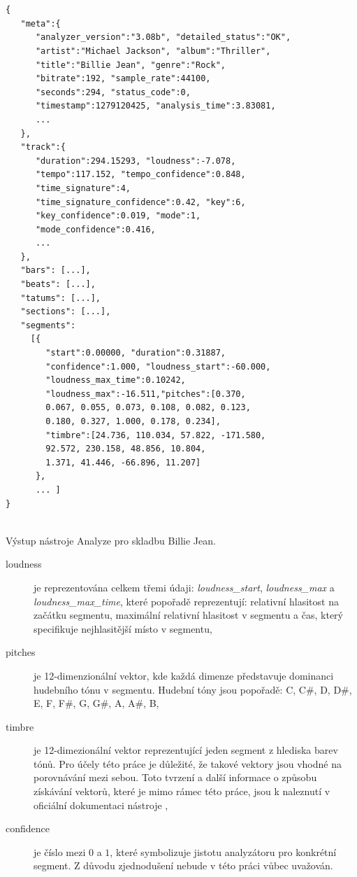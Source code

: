 \documentclass[thesis=M,czech]{FITthesis}[2012/06/26]
\begin{document}
\begin{listing}
\begin{verbatim}


{  
   "meta":{  
      "analyzer_version":"3.08b", "detailed_status":"OK",
      "artist":"Michael Jackson", "album":"Thriller",
      "title":"Billie Jean", "genre":"Rock",
      "bitrate":192, "sample_rate":44100,
      "seconds":294, "status_code":0,
      "timestamp":1279120425, "analysis_time":3.83081,
      ...
   },
   "track":{  
      "duration":294.15293, "loudness":-7.078,
      "tempo":117.152, "tempo_confidence":0.848,
      "time_signature":4,
      "time_signature_confidence":0.42, "key":6,
      "key_confidence":0.019, "mode":1,
      "mode_confidence":0.416,
      ...
   },
   "bars": [...],
   "beats": [...],
   "tatums": [...],
   "sections": [...],
   "segments":
     [{ 
        "start":0.00000, "duration":0.31887,
        "confidence":1.000, "loudness_start":-60.000,
        "loudness_max_time":0.10242,
        "loudness_max":-16.511,"pitches":[0.370,
        0.067, 0.055, 0.073, 0.108, 0.082, 0.123,
        0.180, 0.327, 1.000, 0.178, 0.234],
        "timbre":[24.736, 110.034, 57.822, -171.580,
        92.572, 230.158, 48.856, 10.804,
        1.371, 41.446, -66.896, 11.207]
      },
      ... ]
}


\end{verbatim}
\caption{Výstup nástroje Analyze pro skladbu Billie Jean.} 
\label{json-example}
\end{listing}

\begin{description}
\item[loudness]

je reprezentována celkem třemi údaji: \textit{loudness\_start}, \textit{loudness\_max} a \textit{loudness\_max\_time}, které popořadě reprezentují: relativní hlasitost na začátku segmentu, maximální relativní hlasitost v segmentu a čas, který specifikuje nejhlasitější místo v segmentu,
 
\item[pitches] je 12-dimenzionální vektor, kde každá dimenze představuje dominanci hudebního tónu v segmentu. Hudební tóny jsou popořadě: C, C\#, D, D\#, E, F, F\#, G, G\#, A, A\#, B,

\item[timbre] je 12-dimezionální vektor reprezentující jeden segment z hlediska barev tónů. Pro účely této práce je důležité, že takové vektory jsou vhodné na porovnávání mezi sebou. Toto tvrzení a další informace o způsobu získávání vektorů, které je mimo rámec této práce, jsou k naleznutí v oficiální dokumentaci nástroje \cite{analyze},

\item[confidence] je číslo mezi $0$ a $1$, které symbolizuje jistotu analyzátoru pro konkrétní segment. Z důvodu zjednodušení nebude v této práci vůbec uvažován.
\end{description}
\end{document}
